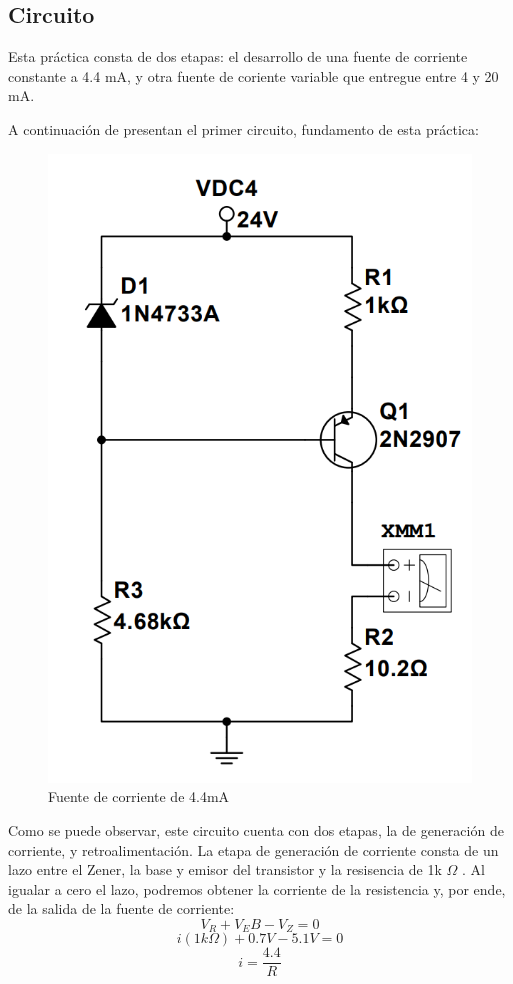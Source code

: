 \subsection{Circuito}
Esta práctica consta de dos etapas: el desarrollo de una fuente de corriente constante a 4.4 mA, y otra fuente
 de coriente variable que entregue entre 4 y 20 mA.

A continuación de presentan el primer circuito, fundamento de esta práctica:
\begin{figure}[h]
    \centering
    \includegraphics[scale=0.35]{media/Screenshot 2022-05-25 012610.png}
    \caption{Fuente de corriente de 4.4mA}
    \label{Fig: Fuente de corriente de 4.4 mA}
\end{figure}

Como se puede observar, este circuito cuenta con dos etapas, la de generación de corriente, y retroalimentación. La 
etapa de generación de corriente consta de un lazo entre el Zener, la base y emisor del transistor y la resisencia de 
1k \(\Omega\) . Al igualar a cero el lazo, podremos obtener la corriente de la resistencia y, por ende, de la salida de 
la fuente de corriente:
\[ V_R + V_EB - V_Z = 0 \]
\[ i(1k \Omega ) + 0.7V -5.1V = 0 \]
\[ i = \frac{4.4}{R} \]

